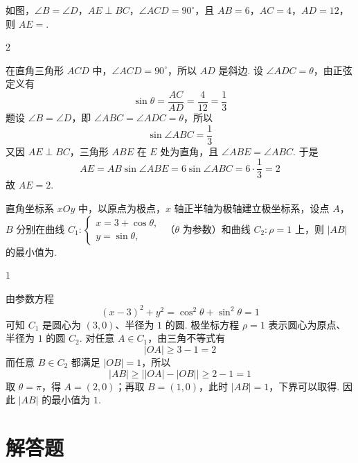 \begin{problem}
如图，\( \angle B = \angle D\)，\( AE \perp BC\)，\( \angle ACD = 90^{\circ}\)，且 \(AB = 6\)，\(AC = 4\)，\(AD = 12\)，则 \(AE =\)\fillinblank{}.

\end{problem}

\begin{answer}
\(2\)
\end{answer}

\begin{solution}
在直角三角形 \(ACD\) 中，\(\angle ACD=90^\circ\)，所以 \(AD\) 是斜边. 设 \(\angle ADC=\theta\)，由正弦定义有
\[
\sin\theta=\frac{AC}{AD}=\frac{4}{12}=\frac13
\]
题设 \(\angle B=\angle D\)，即 \(\angle ABC=\angle ADC=\theta\)，所以
\[
\sin\angle ABC=\frac13
\]
又因 \(AE\perp BC\)，三角形 \(ABE\) 在 \(E\) 处为直角，且 \(\angle ABE=\angle ABC\). 于是
\[
AE=AB\sin\angle ABE
=6\sin\angle ABC
=6\cdot\frac13=2
\]
故 \(AE=2\).
\end{solution}

\begin{problem}
直角坐标系 \(xOy\) 中，以原点为极点，\(x\) 轴正半轴为极轴建立极坐标系，设点 \(A\)，\(B\) 分别在曲线 \(C_1: \begin{cases}
x = 3 + \cos \theta,\\
y = \sin \theta,
\end{cases}\) （\(\theta\) 为参数）和曲线 \(C_2: \rho = 1\) 上，则 \(|AB|\) 的最小值为\fillinblank{}.
\end{problem}

\begin{answer}
\(1\)
\end{answer}

\begin{solution}
由参数方程
\[
(x-3)^2+y^2=\cos^2\theta+\sin^2\theta=1
\]
可知 \(C_1\) 是圆心为 \((3,0)\)、半径为 \(1\) 的圆. 极坐标方程 \(\rho=1\) 表示圆心为原点、半径为 \(1\) 的圆 \(C_2\). 对任意 \(A\in C_1\)，由三角不等式有
\[
|OA|\geqslant 3-1=2
\]
而任意 \(B\in C_2\) 都满足 \(|OB|=1\)，所以
\[
|AB|\geqslant\bigl||OA|-|OB|\bigr|\geqslant2-1=1
\]
取 \(\theta=\pi\)，得 \(A=(2,0)\)；再取 \(B=(1,0)\)，此时 \(|AB|=1\)，下界可以取得. 因此 \(|AB|\) 的最小值为 \(1\).
\end{solution}

\section{解答题}


